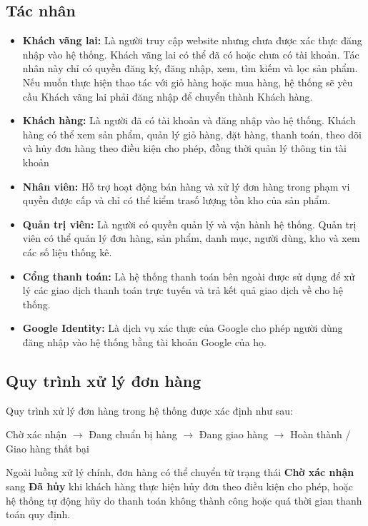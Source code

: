\subsection{Tác nhân}
\begin{itemize}
    \item \textbf{Khách vãng lai:} Là người truy cập website nhưng chưa được xác thực đăng nhập vào hệ thống. Khách vãng lai có thể đã có hoặc chưa có tài khoản. Tác nhân này chỉ có quyền đăng ký, đăng nhập, xem, tìm kiếm và lọc sản phẩm. Nếu muốn thực hiện thao tác với giỏ hàng hoặc mua hàng, hệ thống sẽ yêu cầu Khách vãng lai phải đăng nhập để chuyển thành Khách hàng.
    \item \textbf{Khách hàng:} Là người đã có tài khoản và đăng nhập vào hệ thống. Khách hàng có thể xem sản phẩm, quản lý giỏ hàng, đặt hàng, thanh toán, theo dõi và hủy đơn hàng theo điều kiện cho phép, đồng thời quản lý thông tin tài khoản
    \item \textbf{Nhân viên:} Hỗ trợ hoạt động bán hàng và xử lý đơn hàng trong phạm vi quyền được cấp và chỉ có thể kiểm trasố lượng tồn kho của sản phẩm.
    \item \textbf{Quản trị viên:} Là người có quyền quản lý và vận hành hệ thống. Quản trị viên có thể quản lý đơn hàng, sản phẩm, danh mục, người dùng, kho và xem các số liệu thống kê.
    \item \textbf{Cổng thanh toán:} Là hệ thống thanh toán bên ngoài được sử dụng để xử lý các giao dịch thanh toán trực tuyến và trả kết quả giao dịch về cho hệ thống.
    \item \textbf{Google Identity:} Là dịch vụ xác thực của Google cho phép người dùng đăng nhập vào hệ thống bằng tài khoản Google của họ.
\end{itemize}

\subsection{Quy trình xử lý đơn hàng}

Quy trình xử lý đơn hàng trong hệ thống được xác định như sau:

\begin{center}
Chờ xác nhận $\rightarrow$ Đang chuẩn bị hàng $\rightarrow$ Đang giao hàng $\rightarrow$ Hoàn thành / Giao hàng thất bại
\end{center}

Ngoài luồng xử lý chính, đơn hàng có thể chuyển từ trạng thái \textbf{Chờ xác nhận} sang \textbf{Đã hủy} khi khách hàng thực hiện hủy đơn theo điều kiện cho phép, hoặc hệ thống tự động hủy do thanh toán không thành công hoặc quá thời gian thanh toán quy định.

